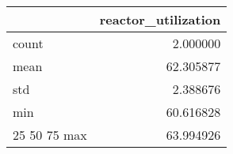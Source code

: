\begin{tabular}{lr}
\toprule
 & reactor\_utilization \\
\midrule
count & 2.000000 \\
mean & 62.305877 \\
std & 2.388676 \\
min & 60.616828 \\
25%
50%
75%
max & 63.994926 \\
\bottomrule
\end{tabular}

